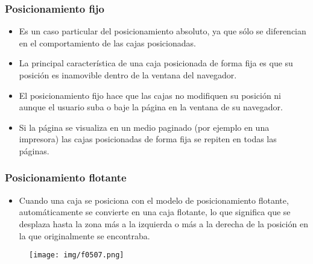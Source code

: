 
\begin{frame}
\frametitle{Posicionamiento fijo}

\begin{itemize}
  \item Es un caso particular del posicionamiento absoluto, ya que sólo se diferencian en el comportamiento de las cajas posicionadas.
  \item La principal característica de una caja posicionada de forma fija es que su posición es inamovible dentro de la ventana del navegador.
  \item El posicionamiento fijo hace que las cajas no modifiquen su posición ni aunque el usuario suba o baje la página en la ventana de su navegador.
  \item Si la página se visualiza en un medio paginado (por ejemplo en una impresora) las cajas posicionadas de forma fija se repiten en todas las páginas.
\end{itemize}

\end{frame}



\begin{frame}
\frametitle{Posicionamiento flotante}

\begin{itemize}
  \item Cuando una caja se posiciona con el modelo de posicionamiento flotante, automáticamente se convierte en una caja flotante, lo que significa que se desplaza hasta la zona más a la izquierda o más a la derecha de la posición en la que originalmente se encontraba.
\end{itemize}


\begin{center}
\begin{figure}[p]
\texttt{[image: img/f0507.png]}
\end{figure}
\end{center}

\end{frame}



